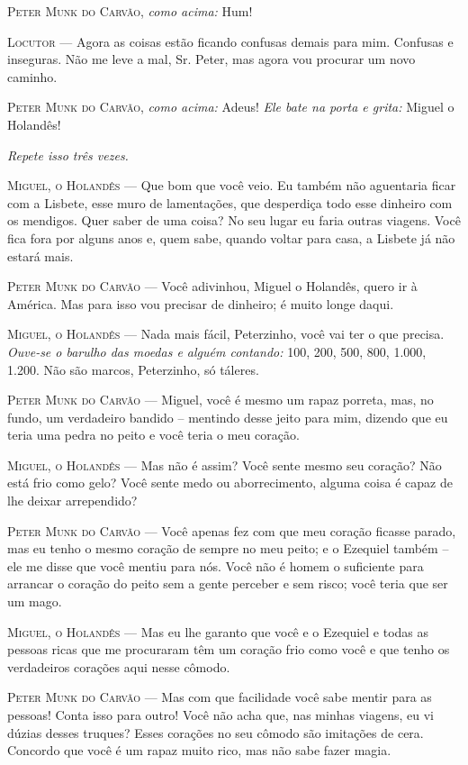 \textsc{Peter Munk do Carvão}, \emph{como acima:} Hum!

\textsc{Locutor} --- Agora as coisas estão ficando confusas demais para mim.
Confusas e inseguras. Não me leve a mal, Sr. Peter, mas agora vou
procurar um novo caminho.

\textsc{Peter Munk do Carvão}, \emph{como acima:} Adeus! \emph{Ele bate na porta
e grita:} Miguel o Holandês!

\emph{Repete isso três vezes.}

\textsc{Miguel, o Holandês} --- Que bom que você veio. Eu também não aguentaria
ficar com a Lisbete, esse muro de lamentações, que desperdiça todo esse
dinheiro com os mendigos. Quer saber de uma coisa? No seu lugar eu faria
outras viagens. Você fica fora por alguns anos e, quem sabe, quando
voltar para casa, a Lisbete já não estará mais.

\textsc{Peter Munk do Carvão} --- Você adivinhou, Miguel o Holandês, quero ir à
América. Mas para isso vou precisar de dinheiro; é muito longe daqui.

\textsc{Miguel, o Holandês} --- Nada mais fácil, Peterzinho, você vai ter o que
precisa. \emph{Ouve-se o barulho das moedas e alguém contando:} 100,
200, 500, 800, 1.000, 1.200. Não são marcos, Peterzinho, só táleres.

\textsc{Peter Munk do Carvão} --- Miguel, você é mesmo um rapaz porreta, mas, no
fundo, um verdadeiro bandido -- mentindo desse jeito para mim, dizendo
que eu teria uma pedra no peito e você teria o meu coração.

\textsc{Miguel, o Holandês} --- Mas não é assim? Você sente mesmo seu coração? Não
está frio como gelo? Você sente medo ou aborrecimento, alguma coisa é
capaz de lhe deixar arrependido?

\textsc{Peter Munk do Carvão} --- Você apenas fez com que meu coração ficasse
parado, mas eu tenho o mesmo coração de sempre no meu peito; e o
Ezequiel também -- ele me disse que você mentiu para nós. Você não é
homem o suficiente para arrancar o coração do peito sem a gente perceber
e sem risco; você teria que ser um mago.

\textsc{Miguel, o Holandês} --- Mas eu lhe garanto que você e o Ezequiel e todas as
pessoas ricas que me procuraram têm um coração frio como você e que
tenho os verdadeiros corações aqui nesse cômodo.

\textsc{Peter Munk do Carvão} --- Mas com que facilidade você sabe mentir para as
pessoas! Conta isso para outro! Você não acha que, nas minhas viagens,
eu vi dúzias desses truques? Esses corações no seu cômodo são imitações
de cera. Concordo que você é um rapaz muito rico, mas não sabe fazer
magia.


